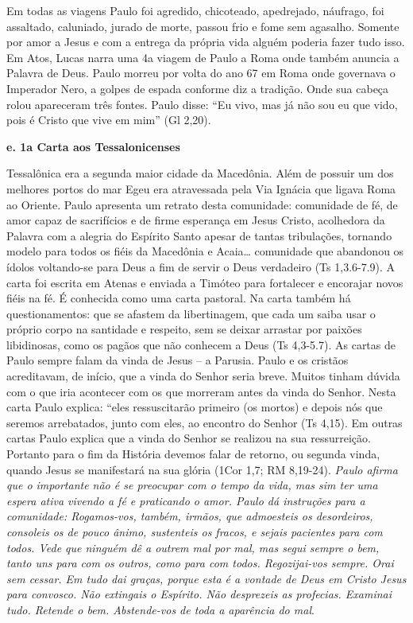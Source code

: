 \documentclass[
]{book}
\begin{document}
Em todas as viagens Paulo foi agredido, chicoteado, apedrejado, náufrago, foi assaltado, caluniado, jurado de morte, passou frio e fome sem agasalho. Somente por amor a Jesus e com a entrega da própria vida alguém poderia fazer tudo isso. Em Atos, Lucas narra uma 4a viagem de Paulo a Roma onde também anuncia a Palavra de Deus. Paulo morreu por volta do ano 67 em Roma onde governava o Imperador Nero, a golpes de espada conforme diz a tradição. Onde sua cabeça rolou apareceram três fontes. Paulo disse: ``Eu vivo, mas já não sou eu que vido, pois é Cristo que vive em mim'' (Gl 2,20).

\textbf{e. 1a Carta aos Tessalonicenses}

Tessalônica era a segunda maior cidade da Macedônia. Além de possuir um dos melhores portos do mar Egeu era atravessada pela Via Ignácia que ligava Roma ao Oriente. Paulo apresenta um retrato desta comunidade: comunidade de fé, de amor capaz de sacrifícios e de firme esperança em Jesus Cristo, acolhedora da Palavra com a alegria do Espírito Santo apesar de tantas tribulações, tornando modelo para todos os fiéis da Macedônia e Acaia\ldots{} comunidade que abandonou os ídolos voltando-se para Deus a fim de servir o Deus verdadeiro (Ts 1,3.6-7.9). A carta foi escrita em Atenas e enviada a Timóteo para fortalecer e encorajar novos fiéis na fé. É conhecida como uma carta pastoral. Na carta também há questionamentos: que se afastem da libertinagem, que cada um saiba usar o próprio corpo na santidade e respeito, sem se deixar arrastar por paixões libidinosas, como os pagãos que não conhecem a Deus (Ts 4,3-5.7). As cartas de Paulo sempre falam da vinda de Jesus -- a Parusia. Paulo e os cristãos acreditavam, de início, que a vinda do Senhor seria breve. Muitos tinham dúvida com o que iria acontecer com os que morreram antes da vinda do Senhor. Nesta carta Paulo explica: ``eles ressuscitarão primeiro (os mortos) e depois nós que seremos arrebatados, junto com eles, ao encontro do Senhor (Ts 4,15). Em outras cartas Paulo explica que a vinda do Senhor se realizou na sua ressurreição. Portanto para o fim da História devemos falar de retorno, ou segunda vinda, quando Jesus se manifestará na sua glória (1Cor 1,7; RM 8,19-24). \emph{Paulo afirma que o importante não é se preocupar com o tempo da vida, mas sim ter uma espera ativa vivendo a fé e praticando o amor. Paulo dá instruções para a comunidade: Rogamos-vos, também, irmãos, que admoesteis os desordeiros, consoleis os de pouco ânimo, sustenteis os fracos, e sejais pacientes para com todos. Vede que ninguém dê a outrem mal por mal, mas segui sempre o bem, tanto uns para com os outros, como para com todos. Regozijai-vos sempre. Orai sem cessar. Em tudo dai graças, porque esta é a vontade de Deus em Cristo Jesus para convosco. Não extingais o Espírito. Não desprezeis as profecias. Examinai tudo. Retende o bem. Abstende-vos de toda a aparência do mal}.
\end{document}
